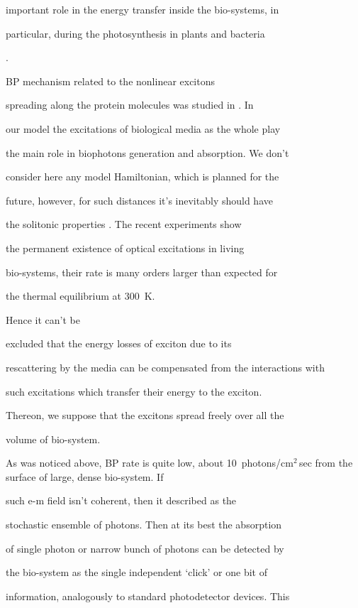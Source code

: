 important role in the energy transfer inside the bio-systems, in

particular, during the photosynthesis  in plants and bacteria


\cite{mayb:4}. 

BP mechanism related to the nonlinear excitons

spreading along the protein molecules was studied in \cite {mayb:7}. In

our model the excitations of biological media as the whole play

the main role in  biophotons generation and absorption. We don't

consider here any model Hamiltonian, which is planned for the

future, however, for such distances it's inevitably should have

the solitonic properties \cite {mayb:5}. The recent experiments show

the permanent existence of optical excitations in living

bio-systems, their rate is many orders larger than expected for

the thermal equilibrium at $300$~K. %

 Hence it can't be

excluded that the energy losses of exciton due to its

 rescattering  by the media can be compensated from the interactions with

such excitations which transfer their energy to the exciton.

Thereon, we suppose that the excitons spread freely over all the

volume of bio-system.



As was noticed above, BP rate is quite low, about 10~photons/cm$^2$\,sec from the surface of large, dense bio-system. If

such e-m field isn't coherent, then it described as the

stochastic ensemble of  photons. Then at its best  the absorption

of single photon or narrow bunch of photons can be detected by

the bio-system as the single independent `click' or one bit of

information, analogously to standard photodetector devices. This

